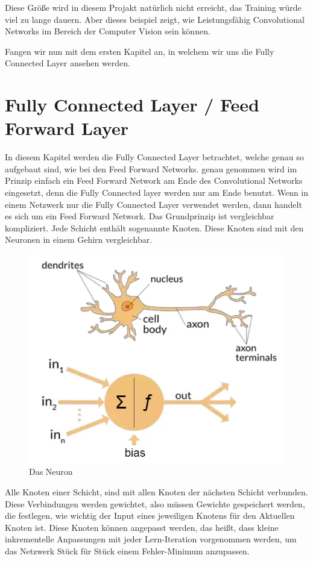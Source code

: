 \documentclass[12pt]{article}
\begin{document}
Diese Größe wird in diesem Projakt natürlich nicht erreicht, das Training würde viel zu lange dauern. Aber dieses beispiel zeigt, wie Leistungsfähig Convolutional Networks im Bereich der Computer Vision sein können. 

Fangen wir nun mit dem ersten Kapitel an, in welchem wir uns die Fully Connected Layer ansehen werden.

\section{Fully Connected Layer / Feed Forward Layer}
In diesem Kapitel werden die Fully Connected Layer betrachtet, welche genau so aufgebaut sind, wie bei den Feed Forward Networks. genau genommen wird im Prinzip einfach ein Feed Forward Network am Ende des Convolutional Networks eingesetzt, denn die Fully Connected layer werden nur am Ende benutzt. Wenn in einem Netzwerk nur die Fully Connected Layer verwendet werden, dann handelt es sich um ein Feed Forward Network. 
Das Grundprinzip ist vergleichbar kompliziert. Jede Schicht enthält sogenannte Knoten. Diese Knoten sind mit den Neuronen in einem Gehirn vergleichbar.

\begin{figure}[H]
\centering
\includegraphics[scale=0.40]{./Images/BA_001_DasNeuron.png}
\caption{Das Neuron}
\label{Das Neuron}
\end{figure}

Alle Knoten einer Schicht, sind mit allen Knoten der nächsten Schicht verbunden. Diese Verbindungen werden gewichtet, also müssen Gewichte gespeichert werden, die festlegen, wie wichtig der Input eines jeweiligen Knotens für den Aktuellen Knoten ist. Diese Knoten können angepasst werden, das heißt, dass kleine inkrementelle Anpassungen mit jeder Lern-Iteration vorgenommen werden, um das Netzwerk Stück für Stück einem Fehler-Minimum anzupassen. 
\end{document}
